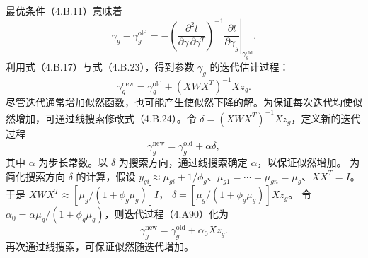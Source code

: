 最优条件（4.B.11）意味着
\[
\gamma_g-\gamma_g^{\mathrm{old}}=
-\left(\frac{\partial^2l}{\partial\gamma\,\partial\gamma^T}\right)^{-1}
\left.\frac{\partial l}{\partial\gamma_g}\right|_{\gamma_g^{\mathrm{old}}}.
\]
利用式（4.B.17）与式（4.B.23），得到参数 $\gamma_g$ 的迭代估计过程：
\begin{equation}
\gamma_g^{\mathrm{new}}=\gamma_g^{\mathrm{old}}+(XWX^T)^{-1}Xz_g.\tag{4.B.24}
\end{equation}
尽管迭代通常增加似然函数，也可能产生使似然下降的解。为保证每次迭代均使似然增加，可通过线搜索修改式（4.B.24）。令 $\delta=(XWX^T)^{-1}Xz_g$，定义新的迭代过程
\begin{equation}
\gamma_g^{\mathrm{new}}=\gamma_g^{\mathrm{old}}+\alpha\delta,\tag{4.B.25}
\end{equation}
其中 $\alpha$ 为步长常数。以 $\delta$ 为搜索方向，通过线搜索确定 $\alpha$，以保证似然增加。
为简化搜索方向 $\delta$ 的计算，假设
$y_{gi}\approx\mu_{gi}+1/\phi_g$、$\mu_{g1}=\cdots=\mu_{gn}=\mu_g$、$XX^T=I$。
于是 $XWX^T\approx[\mu_g/(1+\phi_g\mu_g)]I$，
$\delta=[\mu_g/(1+\phi_g\mu_g)]Xz_g$。
令 $\alpha_0=\alpha\mu_g/(1+\phi_g\mu_g)$，则迭代过程（4.A90）化为
\begin{equation}
\gamma_g^{\mathrm{new}}=\gamma_g^{\mathrm{old}}+\alpha_0Xz_g.\tag{4.B.26}
\end{equation}
再次通过线搜索，可保证似然随迭代增加。
